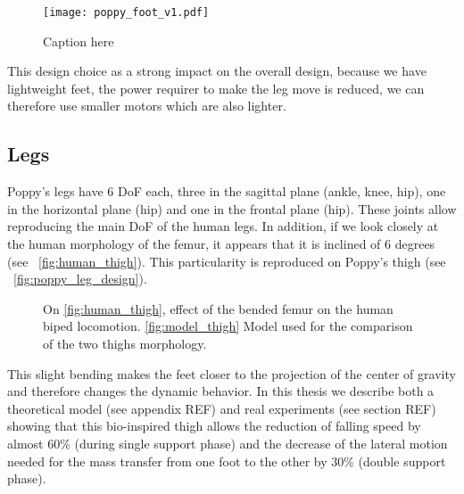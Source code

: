 



\begin{figure}[p]
    \begin{center}
        \texttt{[image: poppy\_foot\_v1.pdf]}
    \end{center}
    \caption{Caption here}
    \label{fig:poppy-foot-v1-design}
\end{figure}


This design choice as a strong impact on the overall design, because we have lightweight feet, the power requirer to make the leg move is reduced, we can therefore use smaller motors which are also lighter.


\subsection{Legs} %

Poppy's legs have 6 DoF each, three in the sagittal plane (ankle, knee, hip), one in the horizontal plane (hip) and one in the frontal plane (hip). These joints allow reproducing the main DoF of the human legs. In addition, if we look closely at the human morphology of the femur, it appears that it is inclined of 6 degrees (see \figurename~\ref{fig:human_thigh}). This particularity is reproduced on Poppy's thigh (see \figurename~\ref{fig:poppy_leg_design}).

\begin{figure}[tb]
\centering
    \hfil
    \caption{ On \ref{fig:human_thigh}, effect of the bended femur on the human biped locomotion. \ref{fig:model_thigh} Model used for the comparison of the two thighs morphology.}
    \label{fig:poppy_thigh}
\end{figure}


This slight bending makes the feet closer to the projection of the center of gravity and therefore changes the dynamic behavior.
In this thesis we describe both a theoretical model (see appendix REF) and real experiments (see section REF) showing that this bio-inspired thigh allows the reduction of falling speed by almost 60\% (during single support phase) and the decrease of the lateral motion needed for the mass transfer from one foot to the other by 30\% (double support phase).


